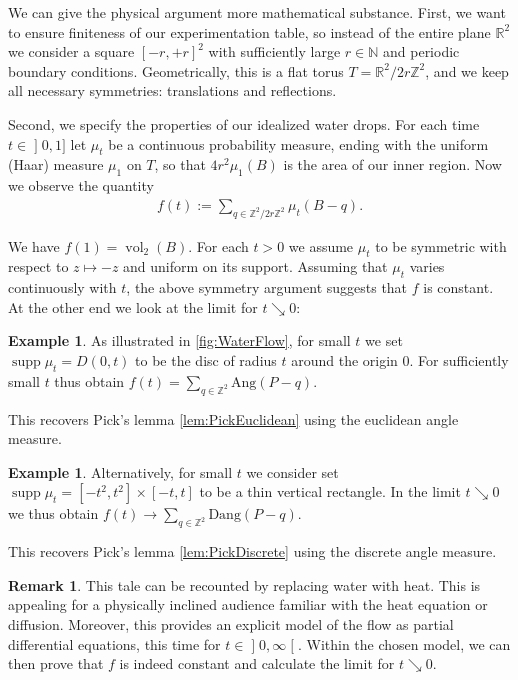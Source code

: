 \documentclass[a4paper]{amsart}
\numberwithin{equation}{section}
\theoremstyle{plain}
\theoremstyle{definition}
\newtheorem{remark}[theorem]{Remark}
\newtheorem{example}[theorem]{Example}
\newcommand{\N}{\mathbb{N}}
\newcommand{\Z}{\mathbb{Z}}
\newcommand{\R}{\mathbb{R}}
\newcommand{\ei}[2]{\mathopen] #1, #2 \mathclose]}
\newcommand{\ee}[2]{\mathopen] #1, #2 \mathclose[}
\DeclareMathOperator{\vol}{vol}
\DeclareMathOperator{\supp}{supp}
\newcommand{\Ang}{\mathrm{Ang}}
\newcommand{\Dang}{\mathrm{Dang}}
\begin{document}
We can give the physical argument more mathematical substance.
%
First, we want to ensure finiteness of our experimentation table,
so instead of the entire plane $\R^2$ we consider a square $[-r,+r]^2$
with sufficiently large $r \in \N$ and periodic boundary conditions.
Geometrically, this is a flat torus $T = \R^2 / 2r\Z^2$,
and we keep all necessary symmetries: translations and reflections.

Second, we specify the properties of our idealized water drops.
For each time $t \in \ei{0}{1}$ let $\mu_t$ be a continuous probability measure,
ending with the uniform (Haar) measure $\mu_1$ on $T$,
so that $4 r^2 \mu_1(B)$ is the area of our inner region. 
Now we observe the quantity 
\begin{align*}
  f(t) := \sum_{q \in \Z^2/2r\Z^2} \mu_t(B-q) .
\end{align*}

We have $f(1) = \vol_2(B)$.
For each $t > 0$ we assume $\mu_t$ to be symmetric
with respect to $z \mapsto -z$ and uniform on its support.
Assuming that $\mu_t$ varies continuously with $t$,
the above symmetry argument suggests that $f$ is constant.
At the other end we look at the limit for $t \searrow 0$:

\begin{example}
  As illustrated in \autoref{fig:WaterFlow}, for small $t$ %
  we set $\supp \mu_t = D(0,t)$ to be the disc of radius $t$ around the origin $0$.
  For sufficiently small $t$ thus obtain $f(t) = \sum_{q \in \Z^2} \Ang(P-q)$.

  This recovers Pick's lemma \ref{lem:PickEuclidean}
  using the euclidean angle measure.
\end{example}

\begin{example}
  Alternatively, for small $t$ %
  we consider set $\supp \mu_t = [-t^2,t^2] \times [-t,t]$
  to be a thin vertical rectangle.
  In the limit $t \searrow 0$ we thus obtain
  $f(t) \to \sum_{q \in \Z^2} \Dang(P-q)$.

  This recovers Pick's lemma \ref{lem:PickDiscrete}
  using the discrete angle measure.
\end{example}

\begin{remark}
  This tale can be recounted by replacing water with heat.
  This is appealing for a physically inclined audience
  familiar with the heat equation or diffusion.
  Moreover, this provides an explicit model of the flow
  as partial differential equations, this time for $t \in \ee{0}{\infty}$.
  Within the chosen model, we can then 
  prove that $f$ is indeed constant
  and calculate the limit for $t \searrow 0$.
\end{remark}
\end{document}
